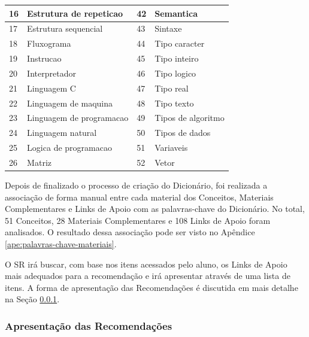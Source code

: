 \begin{table}[h]
\begin{tabular}{|p{2cm}|p{4cm}|p{2cm}|p{4cm}|}
\hline
16 & Estrutura de repeticao    & 42 & Semantica                \\
\hline
17 & Estrutura sequencial      & 43 & Sintaxe                  \\
\hline
18 & Fluxograma                & 44 & Tipo caracter            \\
\hline
19 & Instrucao                 & 45 & Tipo inteiro             \\
\hline
20 & Interpretador             & 46 & Tipo logico              \\
\hline
21 & Linguagem C               & 47 & Tipo real                \\
\hline
22 & Linguagem de maquina      & 48 & Tipo texto               \\
\hline
23 & Linguagem de programacao  & 49 & Tipos de algoritmo       \\
\hline
24 & Linguagem natural         & 50 & Tipos de dados           \\
\hline
25 & Logica de programacao     & 51 & Variaveis                \\
\hline
26 & Matriz                    & 52 & Vetor                    \\
\hline
\end{tabular}
\end{table}

Depois de finalizado o processo de criação do Dicionário, foi realizada a associação de forma manual entre cada material dos Conceitos,
Materiais Complementares e Links de Apoio com as palavras-chave do Dicionário. No total, 51 Conceitos, 28 Materiais
Complementares e 108 Links de Apoio foram analisados. O resultado dessa associação pode ser visto no Apêndice \ref{ape:palavras-chave-materiais}.

O SR irá buscar, com base nos itens acessados pelo aluno, os Links de Apoio mais adequados
para a recomendação e irá apresentar através de uma lista de itens. A forma de apresentação das Recomendações é discutida
em mais detalhe na Seção \ref{subsection:apresentacao-recomendacoes}.

\subsubsection{Apresentação das Recomendações}\label{subsection:apresentacao-recomendacoes}

